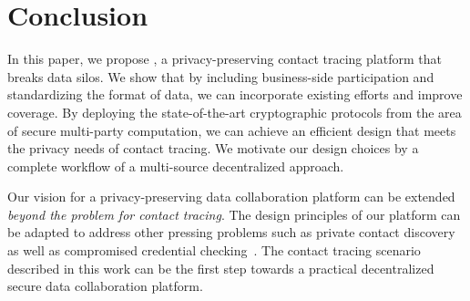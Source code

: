 
\section{Conclusion}

In this paper, we propose \sysname, a privacy-preserving contact tracing platform that breaks data silos. We show that by including business-side participation and standardizing the format of data, we can incorporate existing efforts and improve coverage. By deploying the state-of-the-art cryptographic protocols from the area of secure multi-party computation, we can achieve an efficient design that meets the privacy needs of contact tracing. We motivate our design choices by a complete workflow of a multi-source decentralized approach. %

Our vision for a privacy-preserving data collaboration platform can be extended \emph{beyond the problem for contact tracing}. 
The design principles of our platform can be adapted to address other pressing problems such as private contact discovery~\cite{Kales2019} as well as compromised credential checking~\cite{Li2019}. 
The contact tracing scenario described in this work can be the first step towards a practical decentralized secure data collaboration platform. 


